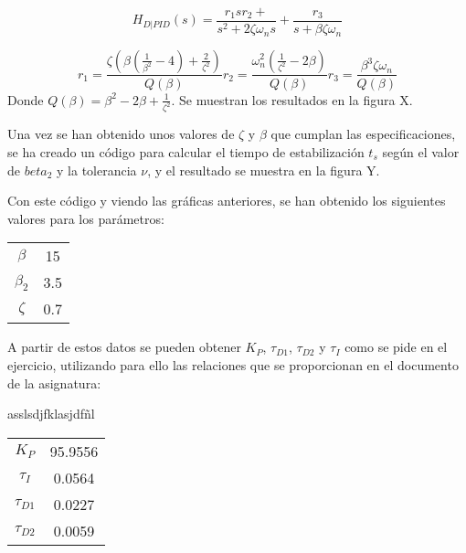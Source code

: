 \documentclass[a4paper]{article}
\begin{document}
\begin{equation}
	H_{D|PID}(s)=\frac{r_1 s r_2+}{s^2 + 2\zeta \omega_n s} + \frac{r_3}{s+ \beta \zeta \omega_n}
\end{equation}

\begin{subequations}
	\begin{equation}
		r_1 = \frac{\zeta(\beta(\frac{1}{\beta^2}-4)+\frac{2}{\zeta^2})}{Q(\beta)}
	\end{equation}
	\begin{equation}
		r_2 = \frac{\omega_n^2(\frac{1}{\zeta^2}-2\beta)}{Q(\beta)}
	\end{equation}
	\begin{equation}
		r_3=\frac{\beta^3 \zeta \omega_n}{Q(\beta)}
	\end{equation}
\end{subequations}
Donde $Q(\beta)=\beta^2-2 \beta + \frac{1}{\zeta^2}$.
Se muestran los resultados en la figura X.

Una vez se han obtenido unos valores de $\zeta$ y $\beta$ que cumplan las especificaciones, se ha creado un código para calcular el tiempo de estabilización $t_s$ según el valor de $beta_2$ y la tolerancia $\nu$, y el resultado se muestra en la figura Y.

Con este código y viendo las gráficas anteriores, se han obtenido los siguientes valores para los parámetros:

\begin{center}
	\begin{tabular}{c|c}
			$\beta$ & 15 \\ 
			$\beta_2$ & 3.5 \\ 
			$\zeta$ & 0.7 \\ 
	\end{tabular} 
\end{center}

A partir de estos datos se pueden obtener $K_P$, $\tau_{D1}$, $\tau_{D2}$ y $\tau_I$ como se pide en el ejercicio, utilizando para ello las relaciones que se proporcionan en el documento de la asignatura:



asslsdjfklasjdfñl



\begin{center}
	\begin{tabular}{c|c}
		$K_P$ & 95.9556 \\ 
		$\tau_I$ & 0.0564 \\ 
		$\tau_{D1}$ & 0.0227 \\ 
		$\tau_{D2}$ & 0.0059 \\ 
	\end{tabular} 
\end{center}
\end{document}
